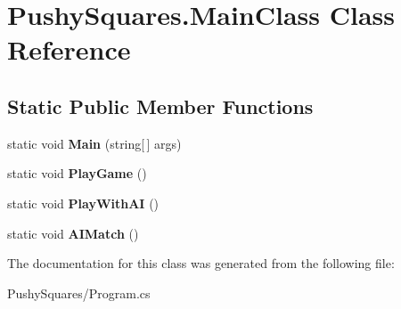 \hypertarget{class_pushy_squares_1_1_main_class}{}\section{Pushy\+Squares.\+Main\+Class Class Reference}
\label{class_pushy_squares_1_1_main_class}
\subsection*{Static Public Member Functions}
\begin{DoxyCompactItemize}
\item 
\mbox{\label{class_pushy_squares_1_1_main_class_aebe03659d4dcf21ec917cf7add5246f0}} 
static void {\bfseries Main} (string\mbox{[}$\,$\mbox{]} args)
\item 
\mbox{\label{class_pushy_squares_1_1_main_class_a21eeaa50eddca48e6e88c5a27b93cf37}} 
static void {\bfseries Play\+Game} ()
\item 
\mbox{\label{class_pushy_squares_1_1_main_class_a13772c723e1ce2a58ddfb4c66f2ff24c}} 
static void {\bfseries Play\+With\+AI} ()
\item 
\mbox{\label{class_pushy_squares_1_1_main_class_a928fe3a1c8e88331ecb36674102b9718}} 
static void {\bfseries A\+I\+Match} ()
\end{DoxyCompactItemize}


The documentation for this class was generated from the following file\+:\begin{DoxyCompactItemize}
\item 
Pushy\+Squares/Program.\+cs\end{DoxyCompactItemize}
